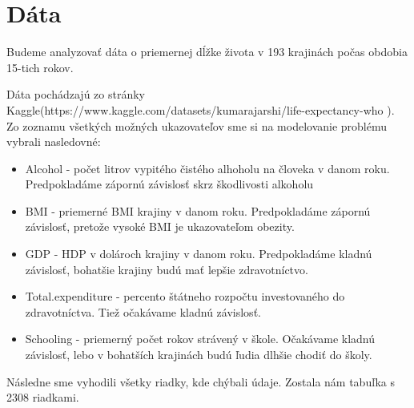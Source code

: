 \section*{Dáta}
Budeme analyzovať dáta o priemernej dĺžke života v 193 krajinách počas obdobia 15-tich rokov.

Dáta pochádzajú zo stránky Kaggle(https://www.kaggle.com/datasets/kumarajarshi/life-expectancy-who ).
Zo zoznamu všetkých možných ukazovateľov sme si na modelovanie problému vybrali nasledovné:
\begin{itemize}
    \item Alcohol - počet litrov vypitého čistého alhoholu na človeka v danom roku. Predpokladáme zápornú závislosť skrz škodlivosti alkoholu
    \item BMI - priemerné BMI krajiny v danom roku. Predpokladáme zápornú závislosť, pretože vysoké BMI je ukazovateľom obezity.
    \item GDP - HDP v dolároch krajiny v danom roku. Predpokladáme kladnú závislosť, bohatšie krajiny budú mať lepšie zdravotníctvo.
    \item Total.expenditure - percento štátneho rozpočtu investovaného do zdravotníctva. Tiež očakávame kladnú závislosť.
    \item Schooling - priemerný počet rokov strávený v škole. Očakávame kladnú závislosť, lebo v bohatších krajinách budú ľudia dlhšie chodiť do školy.
  \end{itemize}
Následne sme vyhodili všetky riadky, kde chýbali údaje. Zostala nám tabuľka s 2308 riadkami.

